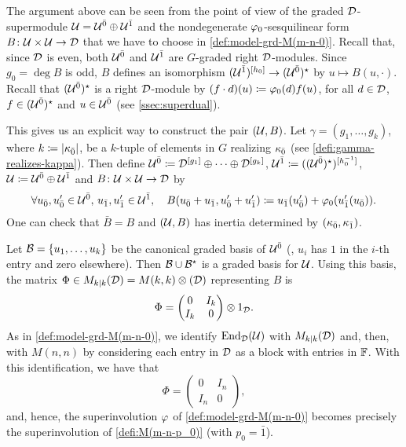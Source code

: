 The argument above can be seen from the point of view of the graded $\mathcal{D}$-supermodule $\mathcal U = \mathcal U^{\bar0} \oplus \mathcal U^{\bar1}$ and the nondegenerate $\varphi_0$-sesquilinear form $B\colon \mathcal U\times \mathcal U \to \mathcal{D}$ that we have to choose in \cref{def:model-grd-M(m-n-0)}. 
Recall that, since $\mathcal{D}$ is even, both $\mathcal U^{\bar0}$ and $\mathcal U^{\bar1}$ are $G$-graded right $\mathcal{D}$-modules. 
Since $g_0 = \deg B$ is odd, $B$ defines an isomorphism $(\mathcal U^{\bar1})^{[h_0]} \to (\mathcal U^{\bar0})^\star$ by $u \mapsto B(u, \cdot)$. 
Recall that $(\mathcal U^{\bar0})^\star$ is a right $\mathcal{D}$-module by $(f\cdot d) (u) \coloneqq \varphi_0(d) f(u)$, for all $d\in \mathcal{D}$, $f\in (\mathcal U^{\bar0})^\star$ and $u \in \mathcal U^{\bar0}$ (see \cref{ssec:superdual}).  

This gives us an explicit way to construct the pair $(\mathcal U, B)$. 
Let $\gamma = (g_1, \ldots, g_k)$, where $k \coloneqq |\kappa_{\bar{0}}|$, be a $k$-tuple of elements in $G$ 
realizing $\kappa_{\bar{0}}$ (see \cref{defi:gamma-realizes-kappa}). 
Then define $\mathcal U^{\bar0} \coloneqq \mathcal{D}^{[g_1]}\oplus \cdots \oplus \mathcal{D}^{[g_k]}$, $\mathcal U^{\bar1} \coloneqq ((\mathcal U^{\bar0})^\star)^{[h_0^{-1}]}$, $\mathcal U \coloneqq \mathcal U^{\bar0} \oplus \mathcal U^{\bar1}$ and $B\colon \mathcal U\times\mathcal U \to \mathcal{D}$ by
\[\label{eq:defi-B-for-P(n)}
    \forall u_{\bar{0}}, u_{\bar{0}}' \in \mathcal U^{\bar0}, \, u_{\bar{1}}, u_{\bar{1}}' \in \mathcal U^{\bar1}, \quad B(u_{\bar{0}} + u_{\bar{1}}, u_{\bar{0}}' + u_{\bar{1}}') \coloneqq u_{\bar{1}}(u_{\bar{0}}') + \varphi_0( u_{\bar{1}}' (u_{\bar{0}}) ).
\]
One can check that $\bar B = B$ and $(\mathcal U, B)$ has inertia determined by $(\kappa_{\bar{0}}, \kappa_{\bar{1}})$.

Let $\mathcal B = \{ u_1, \ldots, u_k \}$ be the canonical graded basis of $\mathcal U^{\bar0}$ (\ie, $u_i$ has $1$ in the $i$-th entry and zero elsewhere). 
Then $\mathcal B \cup \mathcal B^\star$ is a graded basis for $\mathcal U$. 
Using this basis, the matrix $\Phi \in M_{k|k}(\mathcal{D}) = M(k,k) \otimes (\mathcal{D})$ representing $B$ is 
\[
    \Phi = 
    \begin{pmatrix}
        0 & I_{k}\\
        I_{k} & 0
    \end{pmatrix} \otimes 1_{\mathcal{D}}.
\]
As in \cref{def:model-grd-M(m-n-0)}, we identify $\operatorname{End}_{\mathcal{D}} (\mathcal U)$ with $M_{k|k}(\mathcal{D})$ and, then, with $M(n, n)$ by considering each entry in $\mathcal{D}$ as a block with entries in $\mathbb{F}$. 
With this identification, we have that
\[\label{eq:matrix-Phi-for-P}
    \Phi = 
    \begin{pmatrix}
        0 & I_{n}\\
        I_{n} & 0
    \end{pmatrix}, 
\]
and, hence, the superinvolution $\varphi$ of \cref{def:model-grd-M(m-n-0)} becomes precisely the superinvolution of \cref{defi:M(m-n-p_0)} (with $p_0 = \bar 1$). 

